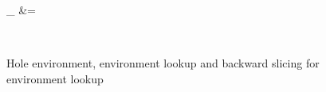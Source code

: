 \begin{figure}[H]
\flushleft \shadebox{$\hole_{\Gamma} = \rho$}
\begin{salign}
   \hole_{} &= 
\end{salign}
\\[2mm]

\flushleft {}
\caption{Hole environment, environment lookup and backward slicing for environment lookup}
\end{figure}
